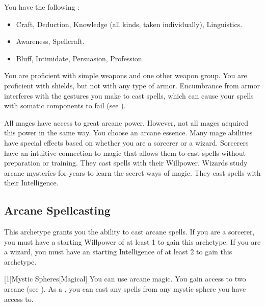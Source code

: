         You have the following :
        \begin{itemize}
            \item {} Craft, Deduction, Knowledge (all kinds, taken individually), Linguistics.
            \item {} Awareness, Spellcraft.
            \item {} Bluff, Intimidate, Persuasion, Profession.
        \end{itemize}

        You are proficient with simple weapons and one other weapon group.
        You are proficient with shields, but not with any type of armor.
        Encumbrance from armor interferes with the gestures you make to cast spells, which can cause your spells with somatic components to fail (see ).

        All mages have access to great arcane power.
        However, not all mages acquired this power in the same way.
        You choose an arcane essence.
        Many mage abilities have special effects based on whether you are a sorcerer or a wizard.
         Sorcerers have an intuitive connection to magic that allows them to cast spells without preparation or training.
        They cast spells with their Willpower.
         Wizards study arcane mysteries for years to learn the secret ways of magic.
        They cast spells with their Intelligence.

    \subsection{Arcane Spellcasting}
        This archetype grants you the ability to cast arcane spells.
        If you are a sorcerer, you must have a starting Willpower of at least 1 to gain this archetype.
        If you are a wizard, you must have an starting Intelligence of at least 2 to gain this archetype.

        [1]{Mystic Spheres}[Magical]
        You can use arcane magic.
        You gain access to two arcane  (see ).
        As a , you can cast any  spells from any mystic sphere you have access to.

